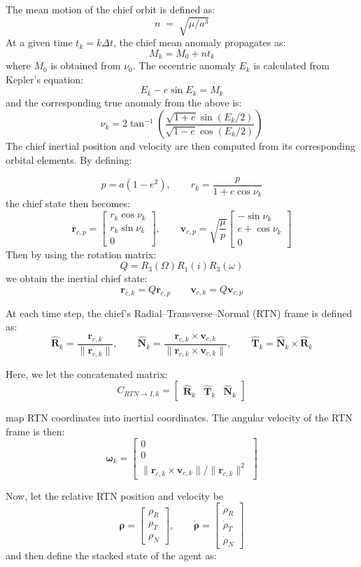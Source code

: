 The mean motion of the chief orbit is defined as:
\[
n \;=\; \sqrt{\mu/a^3}
\]
At a given time $t_k = k\Delta t$, the chief mean anomaly propagates as:
\[
M_k = M_0 + nt_k
\]
where $M_0$ is obtained from $\nu_0$. The eccentric anomaly $E_k$ is calculated from Kepler's equation:
\[
E_k - e\sin E_k = M_k
\]
and the corresponding true anomaly from the above is:
\[
\nu_k
=
2 \tan^{-1}
\left(
\frac{\sqrt{1+e}\sin(E_k/2)}
     {\sqrt{1-e}\cos(E_k/2)}
\right)
\]
The chief inertial position and velocity are then computed from its corresponding orbital elements. By defining:


\[
p = a(1-e^2),
\qquad
r_k = \frac{p}{1+e\cos\nu_k}
\]
the chief state then becomes:
\[
\mathbf{r}_{c,p}
=
\begin{bmatrix}
r_k\cos\nu_k\\
r_k\sin\nu_k\\
0
\end{bmatrix},
\qquad
\mathbf{v}_{c,p}
=
\sqrt{\frac{\mu}{p}}
\begin{bmatrix}
-\sin\nu_k\\
e+\cos\nu_k\\
0
\end{bmatrix}
\]
Then by using the rotation matrix:
\[
Q = R_3(\Omega)R_1(i)R_3(\omega)
\]
we obtain the inertial chief state:
\[
\mathbf{r}_{c,k} = Q\mathbf{r}_{c,p}
\qquad
\mathbf{v}_{c,k} = Q\mathbf{v}_{c,p}
\]

At each time step, the chief's Radial--Transverse--Normal (RTN) frame is defined as:
\[
\hat{\mathbf{R}}_k = \frac{\mathbf{r}_{c,k}}{\|\mathbf{r}_{c,k}\|},
\qquad
\hat{\mathbf{N}}_k =
\frac{\mathbf{r}_{c,k}\times \mathbf{v}_{c,k}}
     {\|\mathbf{r}_{c,k}\times \mathbf{v}_{c,k}\|},
\qquad
\hat{\mathbf{T}}_k = \hat{\mathbf{N}}_k \times \hat{\mathbf{R}}_k
\]

Here, we let the concatenated matrix:
\[
C_{RTN\to I,k}
=
\begin{bmatrix}
\hat{\mathbf{R}}_k & \hat{\mathbf{T}}_k & \hat{\mathbf{N}}_k
\end{bmatrix}
\]

map RTN coordinates into inertial coordinates. The angular velocity of the RTN frame is then:
\[
\boldsymbol{\omega}_k =
\begin{bmatrix}
0\\
0\\
\|\mathbf{r}_{c,k}\times \mathbf{v}_{c,k}\|/\|\mathbf{r}_{c,k}\|^2
\end{bmatrix}
\]

Now, let the relative RTN position and velocity be
\[
\boldsymbol{\rho} =
\begin{bmatrix}
\rho_R\\
\rho_T\\
\rho_N
\end{bmatrix},
\qquad
\dot{\boldsymbol{\rho}} =
\begin{bmatrix}
\dot{\rho}_R\\
\dot{\rho}_T\\
\dot{\rho}_N
\end{bmatrix}
\]
and then define the stacked state of the agent as:

